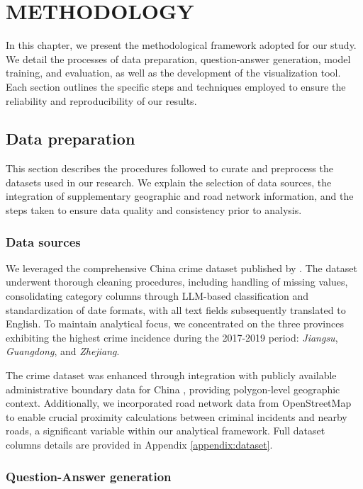 \chapter{ METHODOLOGY}

\noindent
In this chapter, we present the methodological framework adopted for our study. We detail the processes of data preparation, question-answer generation, model training, and evaluation, as well as the development of the visualization tool. Each section outlines the specific steps and techniques employed to ensure the reliability and reproducibility of our results.

\section{Data preparation}

\noindent
This section describes the procedures followed to curate and preprocess the datasets used in our research. We explain the selection of data sources, the integration of supplementary geographic and road network information, and the steps taken to ensure data quality and consistency prior to analysis.

\subsection{Data sources}

We leveraged the comprehensive China crime dataset published by \cite{Zhang2025CrimeDatasetChina}. The dataset underwent thorough cleaning procedures, including handling of missing values, consolidating category columns through LLM-based classification and standardization of date formats, with all text fields subsequently translated to English. To maintain analytical focus, we concentrated on the three provinces exhibiting the highest crime incidence during the 2017-2019 period: \textit{Jiangsu}, \textit{Guangdong}, and \textit{Zhejiang}. 

The crime dataset was enhanced through integration with publicly available administrative boundary data for China \cite{GeoJSON2025China}, providing polygon-level geographic context. Additionally, we incorporated road network data from OpenStreetMap \cite{Vargas2021OSM} to enable crucial proximity calculations between criminal incidents and nearby roads, a significant variable within our analytical framework. Full dataset columns details are provided in Appendix \ref{appendix:dataset}.

\subsection{Question-Answer generation}

